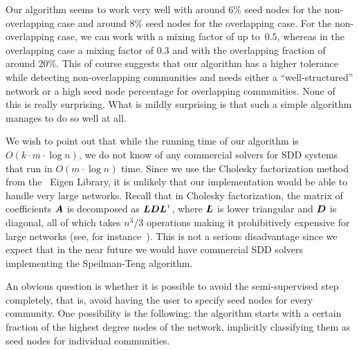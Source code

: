 Our algorithm seems to work very well with around 6$\%$ seed nodes for the 
non-overlapping case and around 8$\%$ seed nodes for the overlapping case. 
For the non-overlapping case, we can work with a mixing factor of up 
to~$0.5$, whereas in the overlapping case a mixing factor of $0.3$ 
and with the overlapping fraction of around $20\%$. This of course 
suggests that our algorithm has a higher tolerance while detecting 
non-overlapping communities and needs either a ``well-structured''
network or a high seed node percentage for overlapping communities. 
None of this is really surprising. What is mildly surprising is that such 
a simple algorithm manages to do so well at all.

We wish to point out that while the running time of our algorithm is 
$O(k \cdot m \cdot \log n)$, we do not know of any commercial solvers 
for SDD systems that run in $O(m \cdot \log n)$ time. Since we use the Cholesky 
factorization method from the \CPP\ Eigen Library, it is unlikely that our 
implementation would be able to handle very large networks. Recall that 
in Cholesky factorization, the matrix of coefficients $\boldsymbol{A}$ is decomposed 
as $\boldsymbol{L} \boldsymbol{D} {\boldsymbol{L}}^{\scriptscriptstyle \mathsf{T}}$, where $\boldsymbol{L}$ is lower triangular 
and $\boldsymbol{D}$ is diagonal, all of which takes $n^3/3$ operations making it 
prohibitively expensive for large networks (see, for instance~\cite{GvL13}). 
This is not a serious disadvantage since we expect that in the near future 
we would have commercial SDD solvers implementing the Speilman-Teng algorithm. 

An obvious question is whether it is possible to avoid the semi-supervised 
step completely, that is, avoid having the user to specify seed nodes 
for every community. One possibility is the following: the algorithm starts 
with a certain fraction of the highest degree nodes of the network, implicitly 
classifying them as seed nodes for individual communities.  
